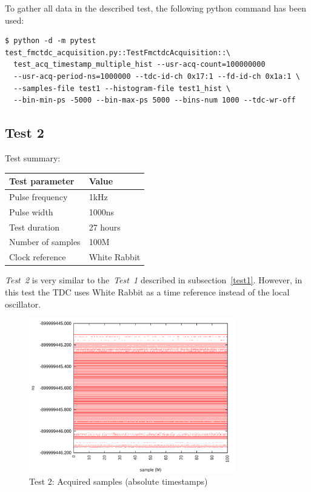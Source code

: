 \documentclass[a4paper, 12pt]{article}
\begin{document}
To gather all data in the described test, the following python command has been used:
\begin{lstlisting}
$ python -d -m pytest test_fmctdc_acquisition.py::TestFmctdcAcquisition::\
  test_acq_timestamp_multiple_hist --usr-acq-count=100000000
  --usr-acq-period-ns=1000000 --tdc-id-ch 0x17:1 --fd-id-ch 0x1a:1 \
  --samples-file test1 --histogram-file test1_hist \
  --bin-min-ps -5000 --bin-max-ps 5000 --bins-num 1000 --tdc-wr-off
\end{lstlisting}

\FloatBarrier

\subsection{Test 2}
\label{test2}
Test summary:
\begin{center}
  \begin{tabular}{|l|l|}
    \hline {\bf Test parameter} & {\bf Value} \\
    \hline
    Pulse frequency                      & 1kHz  \\
    Pulse width                          & 1000ns \\
    Test duration                        & 27 hours \\
    Number of samples                    & 100M \\
    Clock reference                      & White Rabbit \\
    \hline
  \end{tabular}
\end{center}
\textit{Test~2} is very similar to the~\textit{Test~1} described in
subsection~\ref{test1}.
However, in this test the TDC uses White Rabbit as a time reference
instead of the local oscillator.

\begin{figure}[ht!]
  \centering
  \includegraphics[width=0.80\textwidth]{img/test2_samples_absolute.png}
  \caption{Test 2: Acquired samples (absolute timestamps)}
  \label{test2_absolute}
\end{figure}
\end{document}
